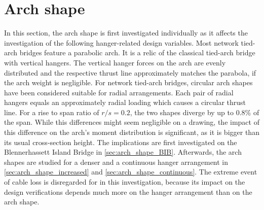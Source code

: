 \newpage
\section{Arch shape} \label{sec:arch_shape}
In this section, the arch shape is first investigated individually as it affects the investigation of the following hanger-related design variables. Most network tied-arch bridges feature a parabolic arch. It is a relic of the classical tied-arch bridge with vertical hangers. 
The vertical hanger forces on the arch are evenly distributed and the respective thrust line approximately matches the parabola, if the arch weight is negligible.
For network tied-arch bridges, circular arch shapes have been considered suitable for radial arrangements. Each pair of radial hangers equals an approximately radial loading which causes a circular thrust line.
For a rise to span ratio of $r/s=0.2$, the two shapes diverge by up to 0.8\% of the span. While this differences might seem negligible on a drawing, the impact of this difference on the arch's moment distribution is significant, as it is bigger than its usual cross-section height. 
The implications are first investigated on the Blennerhassett Island Bridge in \cref{sec:arch_shape_BIB}. Afterwards, the arch shapes are studied for a denser and a continuous hanger arrangement in \cref{sec:arch_shape_increased} and \cref{sec:arch_shape_continuous}. The extreme event of cable loss is disregarded for in this investigation, because its impact on the design verifications depends much more on the hanger arrangement than on the arch shape.


